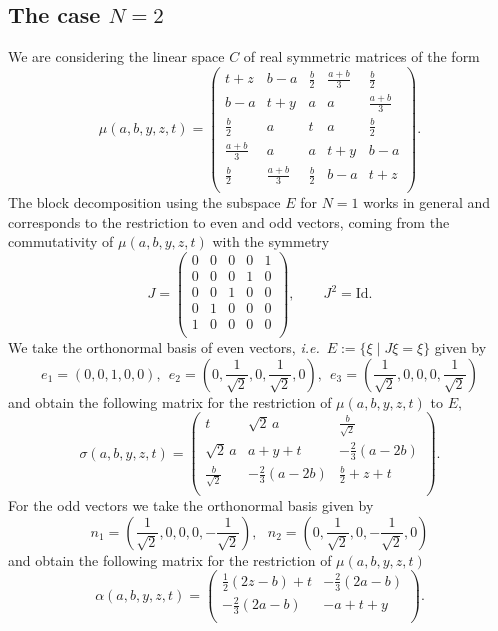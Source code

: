 \documentclass{amsart}
\def\id{{\rm id}}
\newcommand{\ie}{{\it i.e.\/}\ }
\def\id{{\mbox{Id}}}
\def\id{{\rm id}}
\def\id{{\mbox{Id}}}
\begin{document}
\subsection{The case $N=2$}
We are considering the linear space $C$ of real symmetric matrices of the form
$$
\mu(a,b,y,z,t)=\left(
\begin{array}{ccccc}
 t+z & b-a & \frac{b}{2} & \frac{a+b}{3} & \frac{b}{2} \\
 b-a & t+y & a & a & \frac{a+b}{3} \\
 \frac{b}{2} & a & t & a & \frac{b}{2} \\
 \frac{a+b}{3} & a & a & t+y & b-a \\
 \frac{b}{2} & \frac{a+b}{3} & \frac{b}{2} & b-a & t+z \\
\end{array}
\right).
$$
The block decomposition using the subspace $E$ for $N=1$ works in general and corresponds to the restriction to even and odd vectors, coming from the commutativity of $\mu(a,b,y,z,t)$ with the symmetry 
$$
J=\left(
\begin{array}{ccccc}
 0 & 0 & 0 & 0 & 1 \\
 0 & 0 & 0 & 1 & 0 \\
 0 & 0 & 1 & 0 & 0 \\
 0 & 1 & 0 & 0 & 0 \\
 1 & 0 & 0 & 0 & 0 \\
\end{array}
\right), \qquad J^2=\id.
$$
We take the orthonormal basis of even vectors, \ie $E:=\{\xi\mid J\xi= \xi\}$ given by 
$$
e_1=(0,0,1,0,0), \ \ e_2=(0,\frac{1}{\sqrt{2}},0,\frac{1}{\sqrt{2}},0), \ \ e_3=(\frac{1}{\sqrt{2}},0,0,0,\frac{1}{\sqrt{2}})
$$
and obtain the following matrix for the restriction of $\mu(a,b,y,z,t)$ to $E$, 
$$
\sigma(a,b,y,z,t)=\left(
\begin{array}{ccc}
 t & \sqrt{2}\, a & \frac{b}{\sqrt{2}} \\
 \sqrt{2}\, a & a+y+t & -\frac{2}{3}  (a-2 b) \\
 \frac{b}{\sqrt{2}} & -\frac{2}{3}  (a-2 b) & \frac{b}{2}+z+t \\
\end{array}
\right).
$$
For the odd vectors we take the orthonormal basis given by
$$
n_1=(\frac{1}{\sqrt{2}},0,0,0,-\frac{1}{\sqrt{2}}), \  \ \ n_2=(0,\frac{1}{\sqrt{2}},0,-\frac{1}{\sqrt{2}},0)
$$
and obtain the following matrix for the restriction of $\mu(a,b,y,z,t)$
$$
\alpha(a,b,y,z,t)=\left(
\begin{array}{cc}
 \frac{1}{2} (2 z-b)+t & -\frac{2}{3}  (2 a-b) \\
 -\frac{2}{3}  (2 a-b) & -a+t+y \\
\end{array}
\right).
$$
\end{document}
